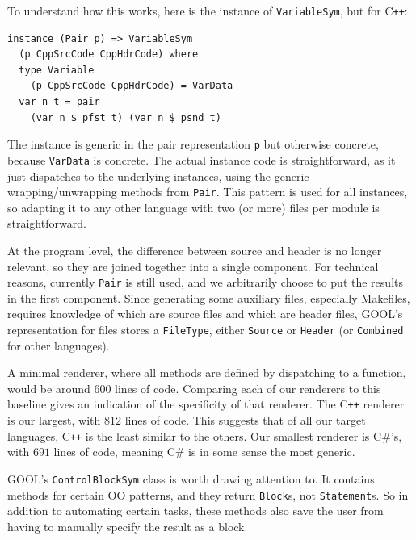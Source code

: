 \documentclass[sigplan,review,anonymous,prologue,dvipsnames]{acmart}
\newcommand{\Csharp}{C\#}
\newcommand{\Cplusplus}{C\texttt{++}}
\begin{document}
To understand how this works, here is the instance of \verb|VariableSym|,
but for \Cplusplus:
\begin{lstlisting}
instance (Pair p) => VariableSym 
  (p CppSrcCode CppHdrCode) where
  type Variable 
    (p CppSrcCode CppHdrCode) = VarData
  var n t = pair 
    (var n $ pfst t) (var n $ psnd t)
\end{lstlisting}
The instance is generic in the pair representation \verb|p| but
otherwise concrete, because \verb|VarData| is concrete. The actual
instance code is straightforward, as it just dispatches to the 
underlying instances, using the generic wrapping/unwrapping
methods from \verb|Pair|.  This pattern is used for all instances,
so adapting it to any other language with two (or more) files per
module is straightforward.

At the program level, the difference between source and header is no
longer relevant, so they are joined together into a single component.
For technical reasons, currently \verb|Pair| is still used, and we arbitrarily
choose to put the results in the first component. Since generating some 
auxiliary files, especially Makefiles, requires knowledge of which are source 
files and which are header files, GOOL's representation for files stores a 
\verb|FileType|, either \verb|Source| or \verb|Header| (or \verb|Combined| for 
other languages).

A minimal renderer, where all methods are defined by dispatching to a function, 
would be around $600$ lines of code. Comparing each of our renderers to this
baseline gives an indication of the specificity 
of that renderer. The \Cplusplus{} renderer is our largest, with 
$812$ lines of code. This suggests that of all our target languages, 
\Cplusplus{} is the least similar to the others. Our smallest renderer is 
\Csharp{}'s, with $691$ lines of code, meaning \Csharp{} is in some sense
the most generic.

GOOL's \verb|ControlBlockSym| class is worth drawing attention to. 
It contains methods for certain OO patterns, and they return \verb|Block|s, not 
\verb|Statement|s. So in addition to automating certain tasks, these methods 
also save the user from having to manually specify the result as a block.
\end{document}
